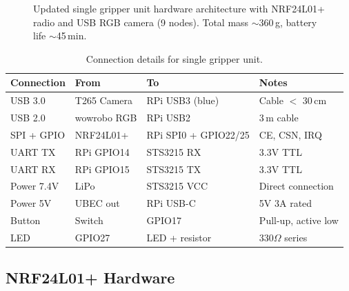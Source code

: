 \documentclass[11pt,a4paper]{article}
\begin{document}
\begin{figure}[htbp]
\caption{Updated single gripper unit hardware architecture with NRF24L01+ radio and USB RGB camera (9 nodes). Total mass ${\sim}$360\,g, battery life ${\sim}$45\,min.}
\label{fig:hw-arch}
\end{figure}

\begin{table}[htbp]
\centering
\caption{Connection details for single gripper unit.}
\begin{tabular}{l l l l}
\toprule
\textbf{Connection} & \textbf{From} & \textbf{To} & \textbf{Notes} \\
\midrule
USB 3.0 & T265 Camera & RPi USB3 (blue) & Cable $<$ 30\,cm \\
USB 2.0 & wowrobo RGB & RPi USB2 & 3\,m cable \\
SPI + GPIO & NRF24L01+ & RPi SPI0 + GPIO22/25 & CE, CSN, IRQ \\
UART TX & RPi GPIO14 & STS3215 RX & 3.3V TTL \\
UART RX & RPi GPIO15 & STS3215 TX & 3.3V TTL \\
Power 7.4V & LiPo & STS3215 VCC & Direct connection \\
Power 5V & UBEC out & RPi USB-C & 5V 3A rated \\
Button & Switch & GPIO17 & Pull-up, active low \\
LED & GPIO27 & LED + resistor & 330$\Omega$ series \\
\bottomrule
\end{tabular}
\label{tab:connections}
\end{table}


\subsection{NRF24L01+ Hardware}
\end{document}
